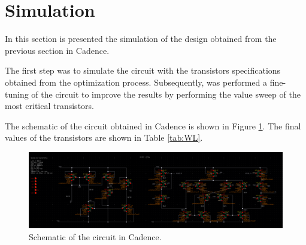 \section{Simulation}

In this section is presented the simulation of the design obtained from the previous section in Cadence.

The first step was to simulate the circuit with the transistors specifications obtained from the optimization process. Subsequently, was performed a fine-tuning of the circuit to improve the results by performing the value sweep of the most critical transistors.

The schematic of the circuit obtained in Cadence is shown in Figure \ref{fig:WL}. The final values of the transistors are shown in Table \ref{tab:WL}.

\begin{figure}[H]
    \centering
    \includegraphics[width=1\textwidth]{Images/wLcircuit.png}
    \caption{Schematic of the circuit in Cadence.}
    \label{fig:WL}
\end{figure}

